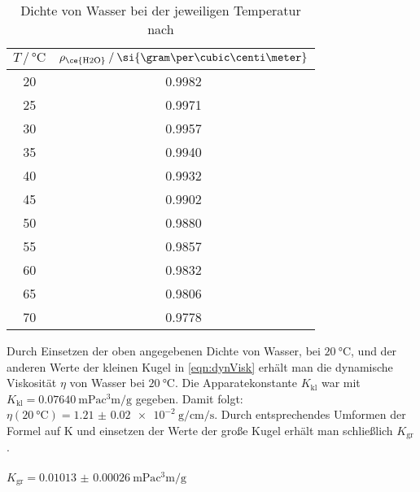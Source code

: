 \documentclass[titlepage=firstiscover, bibliography=totoc, captions=tableheading]{scrartcl}
\begin{document}
\begin{table}
  \centering
  \caption{Dichte von Wasser bei der jeweiligen Temperatur nach \cite{UMaStFl}}
  \label{tab:dichteWasser}
  \begin{tabular}{S S[table-format=1.4]}
    \toprule
    {$T \,/\, \si{\celsius}$} &
    {$\rho_\text{\ce{H2O}} \:/\: \si{\gram\per\cubic\centi\meter}$} \\
     & 0.9982 \\
    25 & 0.9971 \\
    30 & 0.9957 \\
    35 & 0.9940 \\
    40 & 0.9932 \\
    45 & 0.9902 \\
    50 & 0.9880 \\
    55 & 0.9857 \\
    60 & 0.9832 \\
    65 & 0.9806 \\
    70 & 0.9778 \\
    \bottomrule
  \end{tabular}
\end{table}
Durch Einsetzen der oben angegebenen Dichte von Wasser, bei $\SI{20}{\celsius}$, und der anderen
Werte der kleinen Kugel in \eqref{eqn:dynVisk} erhält man die dynamische Viskosität $\eta$ von Wasser bei $\SI{20}{\celsius}$.
Die Apparatekonstante $K_\text{kl}$ war mit $K_\text{kl}=\SI{0.07640}{\milli\pascal\cubic\centi\meter\per\gram}$
gegeben.
Damit folgt: $\eta \left( \SI{20}{\celsius} \right)=\SI{1.21(2)e-2}{\gram\per\centi\meter\per\second}$.
Durch entsprechendes Umformen der Formel auf K und einsetzen der Werte der große Kugel
erhält man schließlich $K_\text{gr}$.\\
\\
$K_\text{gr}=\SI{0.01013(26)}{\milli\pascal\cubic\centi\meter\per\gram}$
\end{document}
